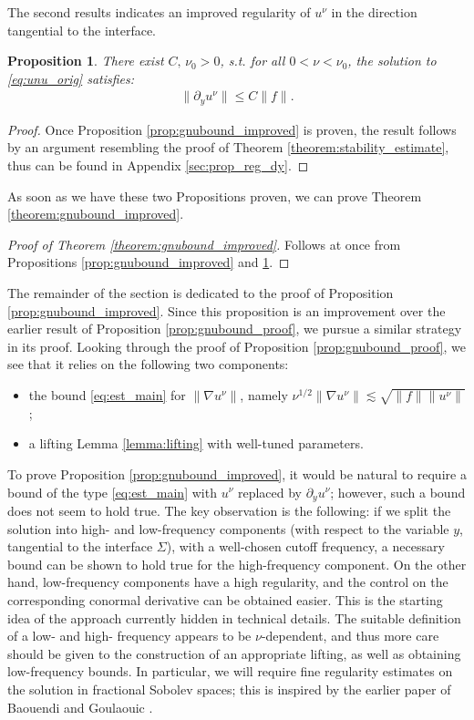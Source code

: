 \documentclass[report]{elsarticle}
\newtheorem{proposition}[theorem]{Proposition}
\numberwithin{theorem}{section}
\begin{document}
The second results indicates an improved regularity of $u^{\nu}$ in the direction tangential to the interface.
\begin{proposition}
	\label{proposition:regularity_dy}
	There exist $C, \, \nu_0>0$, s.t. for all $0<\nu<\nu_0$, the solution to \eqref{eq:unu_orig} satisfies:
	\begin{align*}
		\|\partial_y u^{\nu}\|\leq C\|f\|.  
	\end{align*}
\end{proposition}
\begin{proof}
	Once Proposition \ref{prop:gnubound_improved} is proven, the result  follows by an argument resembling the proof of Theorem \ref{theorem:stability_estimate}, thus can be found in Appendix \ref{sec:prop_reg_dy}.
\end{proof}
As soon as we have these two Propositions proven, we can prove Theorem \ref{theorem:gnubound_improved}. 
\begin{proof}[Proof of Theorem \ref{theorem:gnubound_improved}]
	Follows at once from Propositions  \ref{prop:gnubound_improved} and \ref{proposition:regularity_dy}.
\end{proof}
The remainder of the section is dedicated to the proof of Proposition \ref{prop:gnubound_improved}. 
Since this proposition  is an improvement over the earlier result of Proposition \ref{prop:gnubound_proof}, we pursue a similar strategy in its proof. Looking through the proof of Proposition \ref{prop:gnubound_proof}, we see that it relies on the following two components: 
\begin{itemize}
	\item the bound \eqref{eq:est_main} for $\|\nabla u^{\nu}\|$, namely $\nu^{1/2}\|\nabla u^{\nu}\|\lesssim \sqrt{\|f\|\|u^{\nu}\|}$; 
	\item a lifting Lemma \ref{lemma:lifting} with well-tuned parameters.
\end{itemize}
To prove Proposition \ref{prop:gnubound_improved}, it would be natural to require a bound of the type \eqref{eq:est_main} with $u^{\nu}$ replaced by $\partial_y u^{\nu}$; however, such a bound does not seem to hold true. The key observation is the following: if we split the solution into high- and low-frequency components (with respect to the variable $y$, tangential to the interface $\Sigma$), with a well-chosen cutoff frequency, a necessary bound can be shown to hold true for the high-frequency component. On the other hand, low-frequency components have a high regularity, and the control on the corresponding conormal derivative can be obtained easier. This is the starting idea of the approach currently hidden in technical details. The suitable definition of a low- and high- frequency appears to be $\nu$-dependent, and thus more care should be given to the construction of an appropriate lifting, as well as obtaining low-frequency bounds. In particular, we will require fine regularity estimates on the solution in fractional Sobolev spaces; this is inspired by the earlier paper of Baouendi and Goulaouic \cite{baouendi_goulaouic}. 
\end{document}
